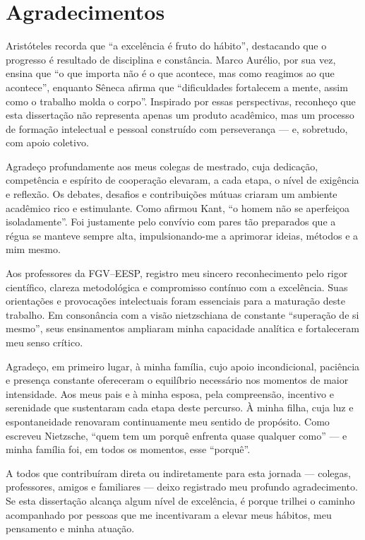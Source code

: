 \chapter*{Agradecimentos}

Aristóteles recorda que “a excelência é fruto do hábito”, destacando que o progresso é resultado de disciplina e constância. Marco Aurélio, por sua vez, ensina que “o que importa não é o que acontece, mas como reagimos ao que acontece”, enquanto Sêneca afirma que “dificuldades fortalecem a mente, assim como o trabalho molda o corpo”. Inspirado por essas perspectivas, reconheço que esta dissertação não representa apenas um produto acadêmico, mas um processo de formação intelectual e pessoal construído com perseverança — e, sobretudo, com apoio coletivo.

Agradeço profundamente aos meus colegas de mestrado, cuja dedicação, competência e espírito de cooperação elevaram, a cada etapa, o nível de exigência e reflexão. Os debates, desafios e contribuições mútuas criaram um ambiente acadêmico rico e estimulante. Como afirmou Kant, “o homem não se aperfeiçoa isoladamente”. Foi justamente pelo convívio com pares tão preparados que a régua se manteve sempre alta, impulsionando-me a aprimorar ideias, métodos e a mim mesmo.

Aos professores da FGV–EESP, registro meu sincero reconhecimento pelo rigor científico, clareza metodológica e compromisso contínuo com a excelência. Suas orientações e provocações intelectuais foram essenciais para a maturação deste trabalho. Em consonância com a visão nietzschiana de constante “superação de si mesmo”, seus ensinamentos ampliaram minha capacidade analítica e fortaleceram meu senso crítico.

Agradeço, em primeiro lugar, à minha família, cujo apoio incondicional, paciência e presença constante ofereceram o equilíbrio necessário nos momentos de maior intensidade. Aos meus pais e à minha esposa, pela compreensão, incentivo e serenidade que sustentaram cada etapa deste percurso. À minha filha, cuja luz e espontaneidade renovaram continuamente meu sentido de propósito. Como escreveu Nietzsche, “quem tem um porquê enfrenta quase qualquer como” — e minha família foi, em todos os momentos, esse “porquê”.

A todos que contribuíram direta ou indiretamente para esta jornada — colegas, professores, amigos e familiares — deixo registrado meu profundo agradecimento. Se esta dissertação alcança algum nível de excelência, é porque trilhei o caminho acompanhado por pessoas que me incentivaram a elevar meus hábitos, meu pensamento e minha atuação.